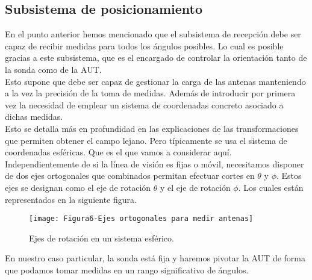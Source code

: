 \subsection{Subsistema de posicionamiento} 

En el punto anterior hemos mencionado que el subsistema de recepción debe ser capaz de recibir medidas para todos los ángulos posibles. Lo cual es posible gracias a este subsistema, que es el encargado de controlar la orientación tanto de la sonda como de la AUT. 
\\

Esto supone que debe ser capaz de gestionar la carga de las antenas manteniendo a la vez la precisión de la toma de medidas. Además de introducir por primera vez la necesidad de emplear un sistema de coordenadas concreto asociado a dichas medidas. 
\\

Esto se detalla más en profundidad en las explicaciones de las transformaciones que permiten obtener el campo lejano. Pero típicamente se usa el sistema de coordenadas esféricas. Que es el que vamos a considerar aquí. 
\\

Independientemente de si la línea de visión es fijas o móvil, necesitamos disponer de dos ejes ortogonales que combinados permitan efectuar cortes en $\theta$ y $\phi$. Estos ejes se designan como el eje de rotación $\theta$ y el eje de rotación $\phi$. Los cuales están representados en la siguiente figura. 

\begin{figure}[h]
    \centering
    \texttt{[image: Figura6-Ejes ortogonales para medir antenas]}
    \caption{Ejes de rotación en un sistema esférico.}
    \label{Ejes-ortogonales-para-medir-antenas}
\end{figure} 

En nuestro caso particular, la sonda está fija y haremos pivotar la AUT de forma que podamos tomar medidas en un rango significativo de ángulos.

\newpage